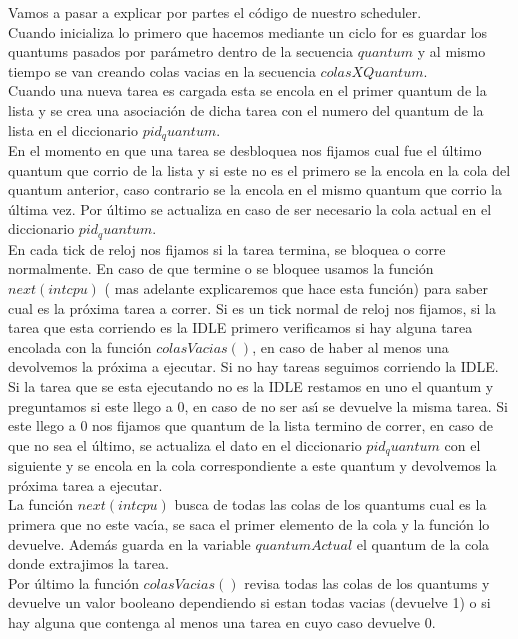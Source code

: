 Vamos a pasar a explicar por partes el c\'{o}digo de nuestro scheduler.\\
Cuando inicializa lo primero que hacemos mediante un ciclo for es guardar los quantums pasados por par\'{a}metro dentro de la 
secuencia $quantum$ y al mismo tiempo se van creando colas vacias en la secuencia $colasXQuantum$.\\
Cuando una nueva tarea es cargada esta se encola en el primer quantum de la lista y se crea una asociaci\'{o}n de dicha tarea 
con el numero del quantum de la lista en el diccionario $pid_quantum$.\\
En el momento en que una tarea se desbloquea nos fijamos cual fue el \'{u}ltimo quantum que corrio de la lista y si este no es 
el primero se la encola en la cola del quantum anterior, caso contrario se la encola en el mismo quantum que corrio la \'{u}ltima vez.
Por \'{u}ltimo se actualiza en caso de ser necesario la cola actual en el diccionario $pid_quantum$.\\
En cada tick de reloj nos fijamos si la tarea termina, se bloquea o corre normalmente. En caso de que termine o se bloquee usamos 
la funci\'{o}n $next(int cpu)$ ( mas adelante explicaremos que hace esta funci\'{o}n) para saber cual es la pr\'{o}xima 
tarea a correr. Si es un tick normal de reloj nos fijamos, si la tarea que esta corriendo es la IDLE primero verificamos si hay 
alguna tarea encolada con la funci\'{o}n $colasVacias()$, en caso de haber al menos una devolvemos la pr\'{o}xima a ejecutar. Si 
no hay tareas seguimos corriendo la IDLE. Si la tarea que se esta ejecutando no es la IDLE restamos en uno el quantum y preguntamos 
si este llego a 0, en caso de no ser as\'{\i} se devuelve la misma tarea. Si este llego a 0 nos fijamos que quantum de la lista 
termino de correr, en caso de que no sea el \'{u}ltimo, se actualiza el dato en el diccionario $pid_quantum$ con el siguiente y 
se encola en la cola correspondiente a este quantum y devolvemos la pr\'{o}xima tarea a ejecutar.\\
La funci\'{o}n $next(int cpu)$ busca de todas las colas de los quantums cual es la primera que no este vac\'{\i}a, se saca el 
primer elemento de la cola y la funci\'{o}n lo devuelve. Adem\'{a}s guarda en la variable $quantumActual$ el quantum de la cola 
donde extrajimos la tarea.\\
Por \'{u}ltimo la funci\'{o}n $colasVacias()$ revisa todas las colas de los quantums y devuelve un valor booleano dependiendo si 
estan todas vacias (devuelve 1) o si hay alguna que contenga al menos una tarea en cuyo caso devuelve 0.\\


